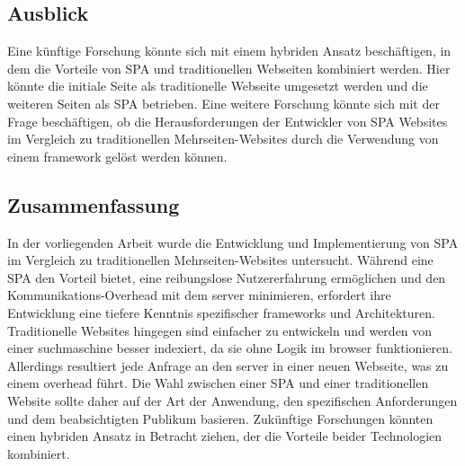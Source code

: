 \subsection{Ausblick}
Eine künftige Forschung könnte sich mit einem hybriden Ansatz beschäftigen, in dem die Vorteile von \ac{SPA} und traditionellen Webseiten kombiniert werden.
Hier könnte die initiale Seite als traditionelle Webseite umgesetzt werden und die weiteren Seiten als \ac{SPA} betrieben.
Eine weitere Forschung könnte sich mit der Frage beschäftigen,
ob die Herausforderungen der Entwickler von \ac{SPA} Websites im Vergleich zu traditionellen Mehrseiten-Websites durch die Verwendung von einem \gls{framework} gelöst werden können.

\subsection{Zusammenfassung}
In der vorliegenden Arbeit wurde die Entwicklung und Implementierung von \ac{SPA} im Vergleich zu traditionellen Mehrseiten-Websites untersucht.
Während eine \ac{SPA} den Vorteil bietet, eine reibungslose Nutzererfahrung ermöglichen und den Kommunikations-Overhead mit dem \gls{server} minimieren, erfordert ihre Entwicklung eine tiefere Kenntnis spezifischer \gls{framework}s und Architekturen.
Traditionelle Websites hingegen sind einfacher zu entwickeln und werden von einer \gls{suchmaschine} besser indexiert, da sie ohne Logik im \gls{browser} funktionieren.
Allerdings resultiert jede Anfrage an den \gls{server} in einer neuen Webseite, was zu einem \gls{overhead} führt.
Die Wahl zwischen einer \ac{SPA} und einer traditionellen Website sollte daher auf der Art der Anwendung, den spezifischen Anforderungen und dem beabsichtigten Publikum basieren.
Zukünftige Forschungen könnten einen hybriden Ansatz in Betracht ziehen, der die Vorteile beider Technologien kombiniert.